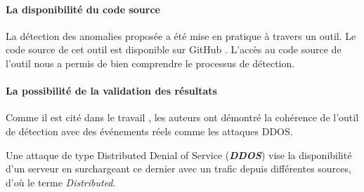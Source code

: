 \paragraph{La disponibilité du code source} La détection des anomalies proposée a été mise en pratique à travers un outil. Le code source de cet outil est disponible sur GitHub \cite{InternetHealthReport}. L'accès au code source de l'outil nous a permis de bien comprendre le processus de détection.


\paragraph{La possibilité de la validation des résultats}  Comme il est cité dans le travail \cite{DBLP:journals/corr/FontugneAPB16}, les auteurs ont démontré la cohérence de l'outil de détection avec des événements réels comme les  attaques DDOS.
\begin{tcolorbox}
	Une attaque de type Distributed Denial of Service (\textbf{\textit{DDOS}}) vise la disponibilité d'un serveur en surchargeant ce dernier avec un trafic depuis différentes sources, d'où le terme \textit{Distributed}.
\end{tcolorbox}



